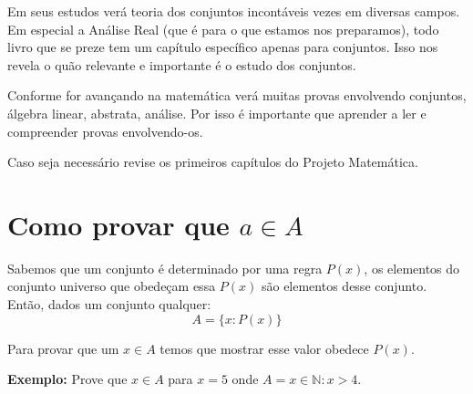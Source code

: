 \documentclass[main.tex]{subfiles}
\begin{document}
Em seus estudos verá teoria dos conjuntos incontáveis vezes em diversas campos. Em especial a Análise Real (que é para o que estamos nos preparamos), todo livro que se preze tem um capítulo específico apenas para conjuntos. Isso nos revela o quão relevante e importante é o estudo dos conjuntos.
\par 

Conforme for avançando na matemática verá muitas provas envolvendo conjuntos, álgebra linear, abstrata, análise. Por isso é importante que aprender a ler e compreender provas envolvendo-os.
\par 

Caso seja necessário revise os primeiros capítulos do Projeto Matemática.

\section{Como provar que $ a \in A $}
Sabemos que um conjunto é determinado por uma regra $P(x)$, os elementos do conjunto universo que obedeçam essa $P(x)$ são elementos desse conjunto. Então, dados um conjunto qualquer:
$$A = \{x: P(x)\}$$

Para provar que um $x \in A$ temos que mostrar esse valor obedece $P(x)$.

\textbf{Exemplo:} Prove que $x \in A$ para $x = 5$ onde $A = {x \in \mathbb{N}: x > 4}$.
 
\end{document}
